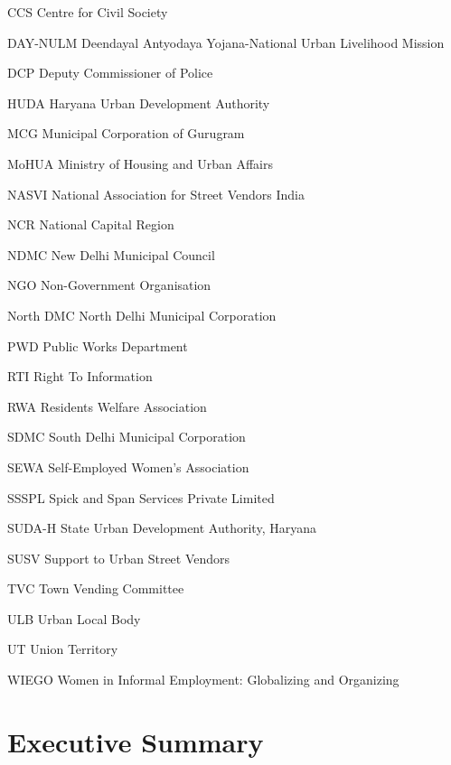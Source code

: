\documentclass[a4paper, 12pt, twoside, table]{article}
\begin{document}
\begin{abbrv}[nosep]

	\item[CCS]			Centre for Civil Society
        \item[DAY-NULM]			Deendayal Antyodaya Yojana-National Urban Livelihood Mission
        \item[DCP]			Deputy Commissioner of Police
	\item[HUDA]			Haryana Urban Development Authority
	\item[MCG]			Municipal Corporation of Gurugram
	\item[MoHUA]			Ministry of Housing and Urban Affairs
	\item[NASVI]			National Association for Street Vendors India
	\item[NCR]			National Capital Region
	\item[NDMC]			New Delhi Municipal Council
	\item[NGO]			Non-Government Organisation
	\item[North DMC]			North Delhi Municipal Corporation
	\item[PWD]			Public Works Department
	\item[RTI]			Right To Information
	\item[RWA]			Residents Welfare Association
	\item[SDMC]			South Delhi Municipal Corporation
	\item[SEWA]			Self-Employed Women's Association
	\item[SSSPL]			Spick and Span Services Private Limited
	\item[SUDA-H]			State Urban Development Authority, Haryana
	\item[SUSV]			Support to Urban Street Vendors
	\item[TVC]			Town Vending Committee
	\item[ULB]			Urban Local Body
	\item[UT]			Union Territory
	\item[WIEGO]			Women in Informal Employment: Globalizing and Organizing


\end{abbrv}

\newpage
\section*{Executive Summary}
\end{document}
